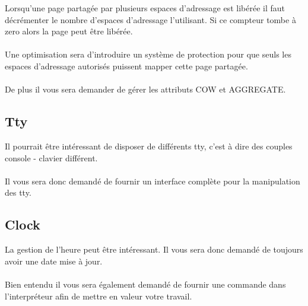 \documentclass[10pt,a4wide]{article}
\begin{document}
Lorsqu'une page partag\'ee par plusieurs espaces d'adressage est lib\'er\'ee
il faut d\'ecr\'ementer le nombre d'espaces d'adressage l'utilisant. Si ce
compteur tombe \`a zero alors la page peut \^etre lib\'er\'ee.

\paragraph{}

Une optimisation sera d'introduire un syst\`eme de protection pour que
seuls les espaces d'adressage autoris\'es puissent mapper cette page
partag\'ee.

\paragraph{}

De plus il vous sera demander de g\'erer les attributs COW et AGGREGATE.

\subsection{Tty}

Il pourrait \^etre int\'eressant de disposer de diff\'erents tty, c'est \`a
dire des couples console - clavier diff\'erent.

\paragraph{}

Il vous sera donc demand\'e de fournir un interface compl\`ete pour la
manipulation des tty.

\subsection{Clock}

La gestion de l'heure peut \^etre int\'eressant. Il vous sera donc
demand\'e de toujours avoir une date mise \`a jour.

\paragraph{}

Bien entendu il vous sera \'egalement demand\'e de fournir une commande
dans l'interpr\'eteur afin de mettre en valeur votre travail.
\end{document}
